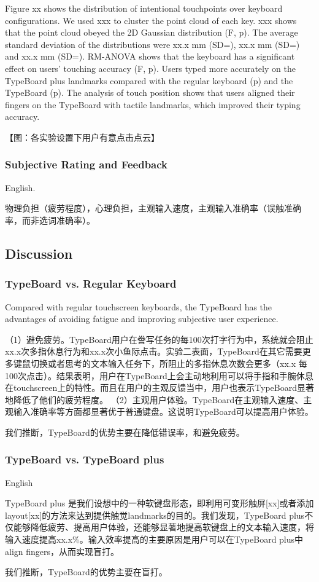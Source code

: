 Figure xx shows the distribution of intentional touchpoints over keyboard configurations. We used xxx to cluster the point cloud of each key. xxx shows that the point cloud obeyed the 2D Gaussian distribution (F, p). The average standard deviation of the distributions were xx.x mm (SD=), xx.x mm (SD=) and xx.x mm (SD=). RM-ANOVA shows that the keyboard has a significant effect on users' touching accuracy (F, p). Users typed more accurately on the TypeBoard plus landmarks compared with the regular keyboard (p) and the TypeBoard (p). The analysis of touch position shows that users aligned their fingers on the TypeBoard with tactile landmarks, which improved their typing accuracy.

【图：各实验设置下用户有意点击点云】

\subsubsection{Subjective Rating and Feedback}

English.

物理负担（疲劳程度），心理负担，主观输入速度，主观输入准确率（误触准确率，而非选词准确率）。

\subsection{Discussion}

\subsubsection{TypeBoard vs. Regular Keyboard}

Compared with regular touchscreen keyboards, the TypeBoard has the advantages of avoiding fatigue and improving subjective user experience.

（1）避免疲劳。TypeBoard用户在誊写任务的每100次打字行为中，系统就会阻止xx.x次多指休息行为和xx.x次小鱼际点击。实验二表面，TypeBoard在其它需要更多键鼠切换或者思考的文本输入任务下，所阻止的多指休息次数会更多（xx.x 每100次点击）。结果表明，用户在TypeBoard上会主动地利用可以将手指和手腕休息在touchscreen上的特性。而且在用户的主观反馈当中，用户也表示TypeBoard显著地降低了他们的疲劳程度。
（2）主观用户体验。TypeBoard在主观输入速度、主观输入准确率等方面都显著优于普通键盘。这说明TypeBoard可以提高用户体验。

我们推断，TypeBoard的优势主要在降低错误率，和避免疲劳。

\subsubsection{TypeBoard vs. TypeBoard plus}

English

TypeBoard plus 是我们设想中的一种软键盘形态，即利用可变形触屏[xx]或者添加layout[xx]的方法来达到提供触觉landmarks的目的。我们发现，TypeBoard plus不仅能够降低疲劳、提高用户体验，还能够显著地提高软键盘上的文本输入速度，将输入速度提高xx.x\%。输入效率提高的主要原因是用户可以在TypeBoard plus中align fingers，从而实现盲打。

我们推断，TypeBoard的优势主要在盲打。
